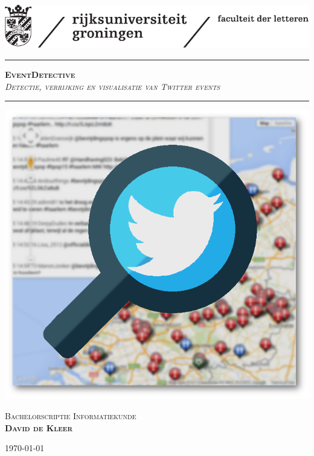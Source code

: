 
\begin{titlepage}
\begin{center}
\setcounter{page}{0}


\vspace*{-2cm}
\includegraphics[scale=1]{logo.pdf}

\vspace{2 cm}

\hrule
\vspace{1 cm}
\Huge{\textbf{\textsc{EventDetective}}}\\
\vspace{0.5 cm}
\Large{\textit{\textsc{Detectie, verrijking en visualisatie van Twitter events}}}

\vspace{1 cm}
\hrule
\vspace{1.5 cm}

\includegraphics[scale=0.45]{mapchartlogo.png}
\vfill


\LARGE{\textsc{Bachelorscriptie Informatiekunde}}\\
\vspace{1.3 cm}
\Large{\textsc{\textbf{David de Kleer}}}
\vspace{0.5 cm}

\vrule
\hspace{0.2 cm}
\normalsize{\textsc{\today}}
\hspace{0.2 cm}
\vrule
\end{center}
\end{titlepage}
